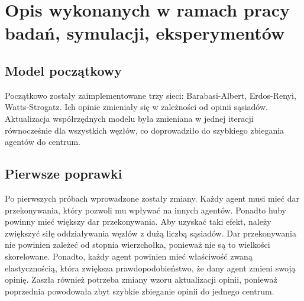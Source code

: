 \documentclass{wfiisul}
\begin{document}

\chapter{Opis wykonanych w ramach pracy badań, symulacji, eksperymentów}


\section{Model początkowy}

Początkowo zostały zaimplementowane trzy sieci: Barabasi-Albert, Erdos-Renyi, Watts-Strogatz.
Ich opinie zmieniały się w zależności od opinii sąsiadów.
Aktualizacja współrzędnych modelu była zmieniana w jednej iteracji równocześnie dla wszystkich węzłów, co doprowadziło do szybkiego zbiegania agentów do centrum.

\section{Pierwsze poprawki}

Po pierwszych próbach wprowadzone zostały zmiany. Każdy agent musi mieć dar przekonywania, który pozwoli mu wpływać na innych agentów.
Ponadto huby powinny mieć większy dar przekonywania. Aby uzyskać taki efekt, należy zwiększyć siłę oddziaływania węzłów z dużą liczbą sąsiadów.
Dar przekonywania nie powinien zależeć od stopnia wierzchołka, ponieważ nie są to wielkości skorelowane.
Ponadto, każdy agent powinien mieć właściwość zwaną elastycznością, która zwiększa prawdopodobieństwo, że dany agent zmieni swoją opinię.
Zaszła również potrzeba zmiany wzoru aktualizacji opinii, ponieważ poprzednia powodowała zbyt szybkie zbieganie opinii do jednego centrum.
\end{document}
